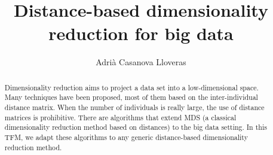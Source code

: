 \documentclass[a4paper,12pt]{article}
\title{Distance-based dimensionality reduction for big data}
\author{Adrià Casanova Lloveras}
\begin{document}


\begin{abstract}
    Dimensionality reduction aims to project a data set into a low-dimensional space. Many techniques have been proposed, most of them based on the inter-individual distance matrix. When the number of individuals is really large, the use of distance matrices is prohibitive. There are algorithms that extend MDS (a classical dimensionality reduction method based on distances) to the big data setting. In this TFM, we adapt these algorithms to any generic distance-based dimensionality reduction method.
\end{abstract}
\pagebreak

\tableofcontents
\pagebreak


\pagebreak


\pagebreak


\pagebreak


\pagebreak


\pagebreak


\pagebreak


\pagebreak

\printbibliography
\pagebreak


\pagebreak
\end{document}
